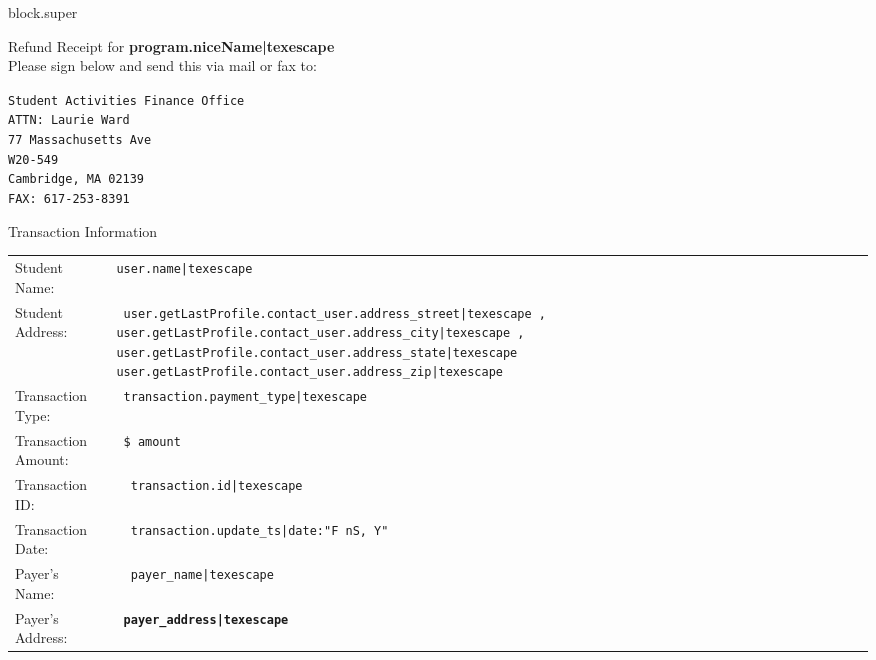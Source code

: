 {%


{%
{{ block.super }}

{\huge Refund Receipt for {\bf {{ program.niceName|texescape }} }} \\

{\large Please sign below and send this via mail or fax to:} \\

\begin{boxedminipage}{2.75in}
\begin{center}
\texttt{Student Activities Finance Office \\
ATTN: Laurie Ward \\
77 Massachusetts Ave \\
W20-549 \\
Cambridge, MA 02139 \\
FAX: 617-253-8391 }
\end{center}
\end{boxedminipage}

\vspace{.4in}

{\Large Transaction Information } 
\vspace{.1in}

\begin{tabular}{ll}

Student Name: &\texttt{ {{user.name|texescape }}} \\
Student Address: &\texttt{ {{user.getLastProfile.contact_user.address_street|texescape }}, 
{{ user.getLastProfile.contact_user.address_city|texescape }}, {{ user.getLastProfile.contact_user.address_state|texescape }} {{ user.getLastProfile.contact_user.address_zip|texescape }}
} \\
Transaction Type: &\texttt{ {{transaction.payment_type|texescape }} } \\
Transaction Amount: &\texttt{ \${{ amount }} } \\
Transaction ID: &\texttt{ {{ transaction.id|texescape }} } \\
Transaction Date: &\texttt{ {{ transaction.update_ts|date:"F nS, Y" }} }\\
Payer's Name: &\texttt{ {{ payer_name|texescape }} } \\
Payer's Address: &{\large \texttt{ {\bf {{ payer_address|texescape }}}} } \\

\end{tabular}
\vspace{.5in}
\\

}}
